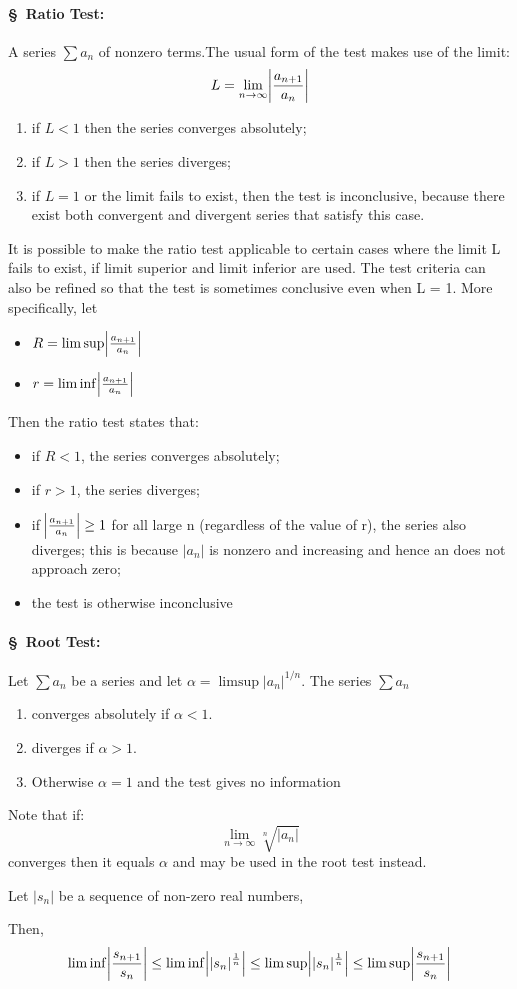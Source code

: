 \documentclass{notes}
\begin{document}
\paragraph{\S\ Ratio Test:}\cite{wikiratio}
A series $\sum a_n$ of nonzero terms.The usual form of the test makes use of the limit:
$$L =  \lim_{n \to \infty} \abs{a_{n+1 } \over a_n}$$
\begin{enumerate}[\bf (i)]
	\item
	if $L < 1$ then the series converges absolutely;
	\item
	if $L > 1$ then the series diverges;
	\item
	if $L = 1$ or the limit fails to exist, then the test is inconclusive, because there exist both convergent and divergent series that satisfy this case.
\end{enumerate}
It is possible to make the ratio test applicable to certain cases where the limit L fails to exist, if limit superior and limit inferior are used. The test criteria can also be refined so that the test is sometimes conclusive even when L = 1. More specifically, let
\begin{itemize}
	\item
	$ R = \limsup \abs{a_{n+1 } \over a_n}$
	\item  $ r = \liminf \abs{a_{n+1 } \over a_n}$
\end{itemize}
Then the ratio test states that:
\begin{itemize}
	\item if $R < 1$, the series converges absolutely;
	\item if $r > 1$, the series diverges;
	\item if $\abs{a_{n+1 } \over a_n} \geq 1$ for all large n (regardless of the value of r), the series also diverges; this is because $|a_{n}|$ is nonzero and increasing and hence an does not approach zero;
	\item the test is otherwise inconclusive
\end{itemize}
\paragraph{\S\ Root Test:}\cite{wikiroot}
Let $\sum a_n$ be a series and let $ \alpha = \limsup |a_n|^{1/n}$. The series $\sum a_n$

\begin{enumerate}[\bf (i)]
	\item
	converges absolutely if $\alpha<1$.
	\item
	diverges if $\alpha>1$.
	\item
	Otherwise $\alpha = 1$ and the test gives no information
\end{enumerate}
Note that if:
$$ \lim\limits_{n \to \infty} \sqrt[n]{|a_n|}$$
converges then it equals $\alpha$ and may be used in the root test instead.
\begin{lemma}{}
	Let $|s_n|$ be a sequence of non-zero real numbers,\par
	Then, $$\liminf \abs{\frac{s_{n+1}}{s_n}} \leq \liminf\abs{|s_n|^{1 \over n}} \leq \limsup\abs{|s_n|^{1 \over n}} \leq \limsup \abs{\frac{s_{n+1}}{s_n}}$$
	
\end{lemma}
\end{document}
